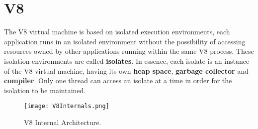\documentclass{l4proj}
\begin{document}
\section{V8}
\hspace*{3em} The V8 virtual machine is based on isolated execution environments, each application runs in an isolated environment without the possibility of accessing resources owned by other applications running within the same V8 process. These isolation environments are called \textbf{isolates}. In essence, each isolate is an instance of the V8 virtual machine, having its own \textbf{heap space}, \textbf{garbage collector} and \textbf{compiler}. Only one thread can access an isolate at a time in order for the isolation to be maintained. 

\begin{figure}[!ht]
  \centering
    \texttt{[image: V8Internals.png]}
	\caption{V8 Internal Architecture.}
\end{figure}
\end{document}
